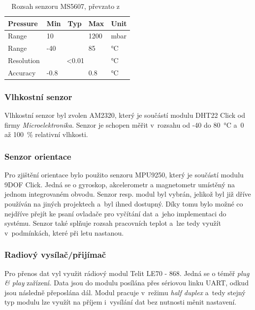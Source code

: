 \documentclass[twoside]{ctuthesis}
\theoremstyle{plain}
\theoremstyle{definition}
\theoremstyle{note}
\begin{document}
			\begin{table}[]
				\begin{tabular}{|l|lll|l|}
				\hline
				Pressure   & \multicolumn{1}{l|}{Min}  & \multicolumn{1}{l|}{Typ} & Max  & Unit \\ \hline
				Range      & \multicolumn{1}{l|}{10}   & \multicolumn{1}{l|}{}    & 1200 & mbar \\ \hline
				Range      & \multicolumn{1}{l|}{-40}  & \multicolumn{1}{l|}{}    & 85   & °C   \\ \hline
				Resolution & \multicolumn{3}{c|}{\textless{}0.01}                        & °C   \\ \hline
				Accuracy   & \multicolumn{1}{l|}{-0.8} & \multicolumn{1}{l|}{}    & 0.8  & °C   \\ \hline
				\end{tabular}
				\caption{Rozsah senzoru MS5607, převzato z~\cite{dsh_MS5607}}
				\label{tab:ms:range}
			\end{table}

			


			
			\subsubsection{Vlhkostní senzor}
			Vlhkostní senzor byl zvolen AM2320, který je součástí modulu DHT22 Click od firmy \textit{Microelektronika}. Senzor je schopen měřit v~rozsahu od -40 do 80~°C a~0 až 100~\% relativní vlhkosti. 



			
			\subsubsection{Senzor orientace}
			Pro zjištění orientace bylo použito senzoru MPU9250, který je součástí modulu 9DOF Click. Jedná se o gyroskop, akcelerometr a magnetometr umístěný na jednom integrovaném obvodu. Senzor resp. modul byl vybrán, jelikož byl již dříve používán na jiných projektech a~byl ihned dostupný. Díky tomu bylo možné co nejdříve přejít ke psaní ovladače pro vyčítání dat a~jeho implementaci do systému. Senzor také splňuje rozsah pracovních teplot \cite{dsh_mpu} a~lze tedy využít v~podmínkách, které při letu nastanou.  
			

			\subsubsection{Radiový vysílač/přijímač}
			\label{sec:telit}
			Pro přenos dat vyl využit rádiový modul Telit LE70 - 868. Jedná se o téměř \textit{plug \& play} zařízení. Data jsou do modulu posílána přes sériovou linku UART, odkud jsou následně přeposlána dál. Modul pracuje v~režimu \textit{half duplex} a~tedy stejný typ modulu lze využít na příjem i~vysílání dat bez nutnosti měnit nastavení. 
\end{document}
